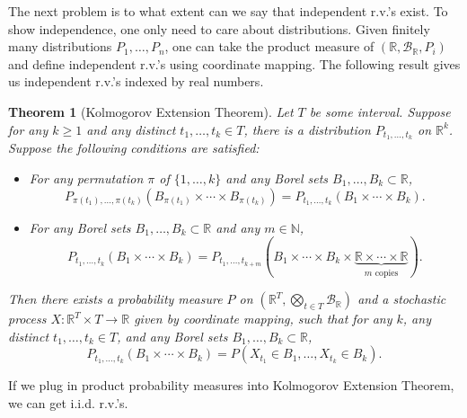 \documentclass[openany]{book}
\newtheorem{theorem}{Theorem}[chapter]
\theoremstyle{definition}
\theoremstyle{remark}
\begin{document}
The next problem is to what extent can we say that independent r.v.'s exist. To show independence, one only need to care about distributions. Given finitely many distributions $P_1,\ldots,P_n$, one can take the product measure of $(\mathbb{R},\mathcal{B}_{\mathbb{R}},P_i)$ and define independent r.v.'s using coordinate mapping. The following result gives us independent r.v.'s indexed by real numbers.
\begin{theorem}[Kolmogorov Extension Theorem]
    Let $T$ be some interval. Suppose for any $k\ge1$ and any distinct $t_1,\ldots,t_k\in T$, there is a distribution $P_{t_1,\ldots,t_k}$ on $\mathbb{R}^k$. Suppose the following conditions are satisfied:
    \begin{itemize}
        \item For any permutation $\pi$ of $\{1,\ldots,k\}$ and any Borel sets $B_1,\ldots,B_k\subset \mathbb{R}$,
        \begin{equation*}
            P_{\pi(t_1),\ldots,\pi(t_k)}(B_{\pi(t_1)}\times\cdots\times B_{\pi(t_k)})=P_{t_1,\ldots,t_k}(B_1\times\cdots\times B_k).
        \end{equation*}

        \item For any Borel sets $B_1,\ldots,B_k\subset \mathbb{R}$ and any $m\in \mathbb{N}$,
        \begin{equation*}
            P_{t_1,\ldots,t_k}(B_1\times\cdots\times B_k)=P_{t_1,\ldots,t_{k+m}}(B_1\times\cdots\times B_k\times\underbrace{\mathbb{R}\times\cdots\times \mathbb{R}}_{m\textrm{ copies}}).
        \end{equation*}
    \end{itemize}
    Then there exists a probability measure $P$ on $(\mathbb{R}^T,\bigotimes_{t\in T}\mathcal{B}_{\mathbb{R}})$ and a stochastic process $X:\mathbb{R}^T\times T\to \mathbb{R}$ given by coordinate mapping, such that for any $k$, any distinct $t_1,\ldots,t_k\in T$, and any Borel sets $B_1,\ldots,B_k\subset \mathbb{R}$,
    \begin{equation*}
        P_{t_1,\ldots,t_k}(B_1\times\cdots\times B_k)=P(X_{t_1}\in B_1,\ldots,X_{t_k}\in B_k).
    \end{equation*}
\end{theorem}
If we plug in product probability measures into Kolmogorov Extension Theorem, we can get i.i.d. r.v.'s.
\end{document}
